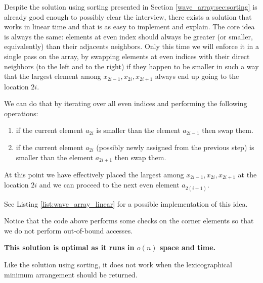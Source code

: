 Despite the solution using sorting presented in Section \ref{wave_array:sec:sorting} is already good enough to
possibly clear the interview, there exists a solution that works in linear time and that is as easy to
implement and explain. The core idea is always the same: elements at even index should always be
greater (or smaller, equivalently) than their adjacents neighbors. Only this time we will enforce it in a single pass on the array, by
swapping elements at even indices with their direct neighbors (to the left and to the right) if they happen to be smaller in such a way that the largest element among  $x_{2i-1},x_{2i},x_{2i+1}$ always end up going to the location $2i$.

We can do that by iterating over all even indices and performing the following operations:
\begin{enumerate}
	\item if the current element $a_{2i}$ is smaller than the element $a_{2i-1}$ then swap them. 
	\item if the current element $a_{2i}$ (possibly newly assigned from the previous step) is smaller than the element $a_{2i+1}$ then swap them.
\end{enumerate}

At this point we have effectively placed the largest among $x_{2i-1},x_{2i},x_{2i+1}$ at the location $2i$ and we can proceed to the next even element $a_{2(i+1)}$. 

See Listing \ref{list:wave_array_linear} for a possible implementation of this idea.



Notice that the code above performs some checks on the corner elements so that we do not perform out-of-bound accesses.

\textbf{This solution is optimal as it runs in $o(n)$ space and time.} 

Like the solution using sorting, it does not work when the lexicographical minimum arrangement should be returned.


